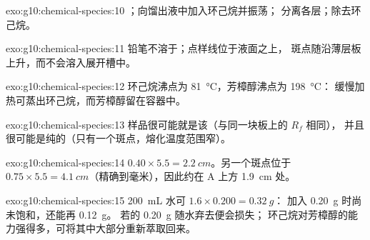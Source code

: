 \begin{solution}{exo:g10:chemical-species:10}
；向馏出液中加入环己烷并振荡；
分离各层；除去环己烷。
\end{solution}

\begin{solution}{exo:g10:chemical-species:11}
铅笔不溶于；点样线位于液面之上，
斑点随沿薄层板上升，而不会溶入展开槽中。
\end{solution}

\begin{solution}{exo:g10:chemical-species:12}
环己烷沸点为 \qty{81}{\celsius}，芳樟醇沸点为 \qty{198}{\celsius}：
缓慢加热可蒸出环己烷，而芳樟醇留在容器中。
\end{solution}

\begin{solution}{exo:g10:chemical-species:13}
样品很可能就是该（与同一块板上的 $R_f$ 相同），
并且很可能是纯的（只有一个斑点，熔化温度范围窄）。
\end{solution}

\begin{solution}{exo:g10:chemical-species:14}
$0.40 \times 5.5 = \qty{2.2}{cm}$。另一个斑点位于 $0.75 \times 5.5 =
\qty{4.1}{cm}$（精确到毫米），因此约在 A 上方 \qty{1.9}{cm} 处。
\end{solution}

\begin{solution}{exo:g10:chemical-species:15}
\qty{200}{mL} 水可 $1.6 \times 0.200 = \qty{0.32}{g}$：
加入 \qty{0.20}{g} 时尚未饱和，还能再 \qty{0.12}{g}。
若的 \qty{0.20}{g} 随水弃去便会损失；
环己烷对芳樟醇的能力强得多，可将其中大部分重新萃取回来。
\end{solution}

